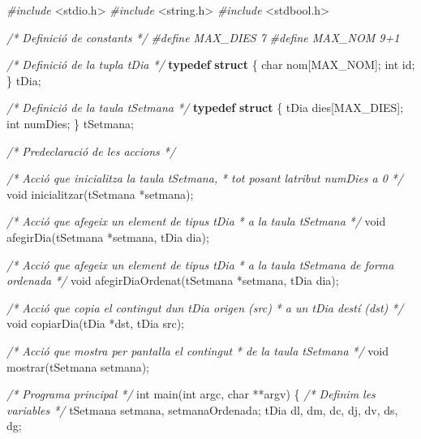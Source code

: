 \documentclass[]{book}
\newenvironment{Shaded}{\begin{snugshade}}{\end{snugshade}}
\newcommand{\CommentTok}[1]{\textcolor[rgb]{0.56,0.35,0.01}{\textit{#1}}}
\newcommand{\DataTypeTok}[1]{\textcolor[rgb]{0.13,0.29,0.53}{#1}}
\newcommand{\ImportTok}[1]{#1}
\newcommand{\KeywordTok}[1]{\textcolor[rgb]{0.13,0.29,0.53}{\textbf{#1}}}
\newcommand{\NormalTok}[1]{#1}
\newcommand{\PreprocessorTok}[1]{\textcolor[rgb]{0.56,0.35,0.01}{\textit{#1}}}
\begin{document}
\begin{Shaded}
\begin{Highlighting}[]
\PreprocessorTok{\#include }\ImportTok{\textless{}stdio.h\textgreater{}}
\PreprocessorTok{\#include }\ImportTok{\textless{}string.h\textgreater{}}
\PreprocessorTok{\#include }\ImportTok{\textless{}stdbool.h\textgreater{}}

\CommentTok{/* Definició de constants */}
\PreprocessorTok{\#define MAX\_DIES 7}
\PreprocessorTok{\#define MAX\_NOM 9+1}

\CommentTok{/* Definició de la tupla tDia */}
\KeywordTok{typedef} \KeywordTok{struct}\NormalTok{ \{}
    \DataTypeTok{char}\NormalTok{ nom[MAX\_NOM];}
    \DataTypeTok{int}\NormalTok{ id;}
\NormalTok{\} tDia;}

\CommentTok{/* Definició de la taula tSetmana */}
\KeywordTok{typedef} \KeywordTok{struct}\NormalTok{ \{}
\NormalTok{    tDia dies[MAX\_DIES];}
    \DataTypeTok{int}\NormalTok{ numDies;}
\NormalTok{\} tSetmana;}

\CommentTok{/* Predeclaració de les accions */}

\CommentTok{/* Acció que inicialitza la taula tSetmana,}
\CommentTok{ * tot posant l\textquotesingle{}atribut numDies a 0 }
\CommentTok{ */}
\DataTypeTok{void}\NormalTok{ inicialitzar(tSetmana *setmana);}

\CommentTok{/* Acció que afegeix un element de tipus tDia}
\CommentTok{ * a la taula tSetmana }
\CommentTok{ */}
\DataTypeTok{void}\NormalTok{ afegirDia(tSetmana *setmana, tDia dia);}

\CommentTok{/* Acció que afegeix un element de tipus tDia}
\CommentTok{ * a la taula tSetmana de forma ordenada }
\CommentTok{ */}
\DataTypeTok{void}\NormalTok{ afegirDiaOrdenat(tSetmana *setmana, tDia dia);}

\CommentTok{/* Acció que copia el contingut d\textquotesingle{}un tDia origen (src)}
\CommentTok{ * a un tDia destí (dst) }
\CommentTok{ */}
\DataTypeTok{void}\NormalTok{ copiarDia(tDia *dst, tDia src);}

\CommentTok{/* Acció que mostra per pantalla el contingut}
\CommentTok{ * de la taula tSetmana }
\CommentTok{ */}
\DataTypeTok{void}\NormalTok{ mostrar(tSetmana setmana);}

\CommentTok{/* Programa principal */}
\DataTypeTok{int}\NormalTok{ main(}\DataTypeTok{int}\NormalTok{ argc, }\DataTypeTok{char}\NormalTok{ **argv)}
\NormalTok{\{}
    \CommentTok{/* Definim les variables */}
\NormalTok{    tSetmana setmana, setmanaOrdenada;}
\NormalTok{    tDia dl, dm, dc, dj, dv, ds, dg; }
    

\end{Highlighting}
\end{Shaded}
\end{document}
